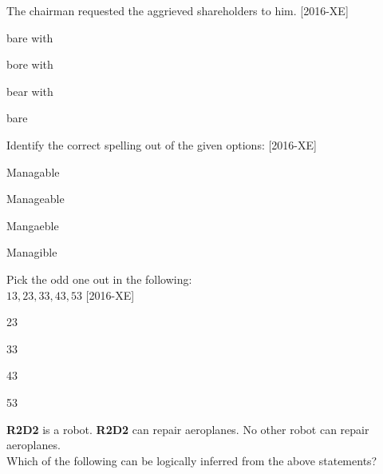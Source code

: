 \iffalse
    \title{Assignment}
    \author{EE24BTECH11066}
    \section{xe}
    \chapter{2016}
  \fi
\item The chairman requested the aggrieved shareholders to \underline{\hspace{1cm}} him. \hfill{[2016-XE]}\\
\begin{enumerate}
\begin{multicols}{4}
\item bare with
\item bore with
\item bear with
\item bare
\end{multicols}
\end{enumerate}
\item Identify the correct spelling out of the given options: \hfill{[2016-XE]}
\begin{enumerate}
\begin{multicols}{4}
\item Managable
\item Manageable
\item Mangaeble
\item Managible
\end{multicols}
\end{enumerate}
\item Pick the odd one out in the following:\\

$13, 23, 33, 43, 53$ \hfill{[2016-XE]}
\begin{enumerate}
\begin{multicols}{4}
\item 23
\item 33
\item 43
\item 53
\end{multicols}
\end{enumerate}
\item \textbf{R2D2} is a robot. \textbf{R2D2} can repair aeroplanes. No other robot can repair aeroplanes.\\

Which of the following can be logically inferred from the above statements? 

